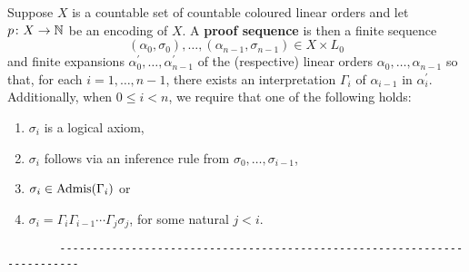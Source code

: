	\begin{dfn}
		Suppose $X$ is a countable set of countable coloured linear orders and let $p\colon X\to\mathbb{N}$ be an encoding of $X$.  A \textbf{proof sequence} is then a finite sequence
		\begin{equation}
			(\alpha_0,\sigma_0),\dotsc,(\alpha_{n-1},\sigma_{n-1})\in X\times L_0
		\end{equation}
		and finite expansions $\alpha^\prime_0,\dotsc,\alpha^\prime_{n-1}$ of the (respective) linear orders $\alpha_0,\dotsc,\alpha_{n-1}$ so that, for each $i=1,\dotsc,n-1$, there exists an interpretation $\Gamma_i$ of $\alpha_{i-1}$ in $\alpha^\prime_i$.  Additionally, when $0\leq i<n$, we require that one of the following holds:
		\begin{enumerate}
			\item	$\sigma_i$ is a logical axiom,
			\item	$\sigma_i$ follows via an inference rule from $\sigma_0,\dotsc,\sigma_{i-1}$,
			\item	$\sigma_i\in\operatorname{Admis}(\Gamma_i)$ or
			\item	$\sigma_i=\Gamma_i\Gamma_{i-1}\dotsb\Gamma_j\sigma_j$, for some natural $j<i$.
		\end{enumerate}
	\end{dfn}
\vfill
	\begin{verbatim}
		-------------------------------------------------------------------------
	\end{verbatim}
